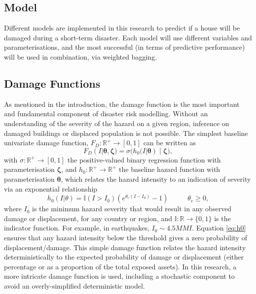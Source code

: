 \documentclass[10pt,a4paper]{article}
\begin{document}
\begin{multicols}{1}
\section{Model}\label{sec:model}
Different models are implemented in this research to predict if a house will be damaged during a short-term disaster. Each model will use different variables and parameterisations, and the most successful (in terms of predictive performance) will be used in combination, via weighted bagging.
\subsection{Damage Functions}\label{sec:damagefn}
As mentioned in the introduction, the damage function is the most important and fundamental component of disaster risk modelling. Without an understanding of the severity of the hazard on a given region, inference on damaged buildings or displaced population is not possible. The simplest baseline univariate damage function, $F_D :\mathbb{R}^+ \rightarrow [0,1] $ can be written as
\begin{equation}\label{eq:fdamage}
  F_D(I|\boldsymbol{\theta},\boldsymbol{\zeta})=\sigma\big(h_0(I|\boldsymbol{\theta})\;|\;\boldsymbol{\zeta}\big),
\end{equation}
with $\sigma :\mathbb{R}^+ \rightarrow [0,1]$ the positive-valued binary regression function with parameterisation $\boldsymbol{\zeta}$, and $h_0 :\mathbb{R}^+ \rightarrow \mathbb{R}^+$ the baseline hazard function with parameterisation $\boldsymbol{\theta}$, which relates the hazard intensity to an indication of severity via an exponential relationship
\begin{equation}\label{eq:h0}
h_0(I|\theta)=\mathbb{I}(I>I_0)(e^{\theta_e(I-I_0)}-1) \;\;\;\;\;\;\;\;\;\; \theta_e\geq 0,
\end{equation}
where $I_0$ is the minimum hazard severity that would result in any observed damage or displacement, for any country or region, and $\mathbb{I} : \mathbb{R} \rightarrow \{0,1\}$ is the indicator function. For example, in earthquakes, $I_0\sim 4.5 MMI$. Equation \ref{eq:h0} ensures that any hazard intensity below the threshold gives a zero probability of displacement/damage. This simple damage function relates the hazard intensity deterministically to the expected probability of damage or displacement (either percentage or as a proportion of the total exposed assets). In this research, a more intricate damage function is used, including a stochastic component to avoid an overly-simplified deterministic model.

\end{multicols}
\end{document}
